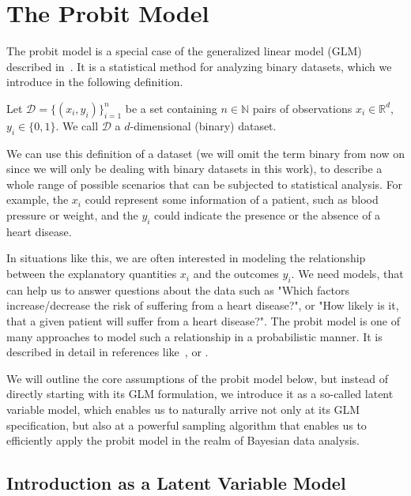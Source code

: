\section{The Probit Model}

The probit model is a special case of the generalized linear model (GLM)
described in~\cite{glm-nelder}.
It is a statistical method for analyzing binary datasets,
which we introduce in the following definition.

\begin{definition}[Dataset]
    Let $\mathcal{D} = \{(x_i, y_i)\}_{i=1}^n$ be a set containing
    $n \in \mathbb{N}$ pairs of observations $x_i \in \mathbb{R}^d$,
    $y_i \in \{0, 1\}$.
    We call $\mathcal{D}$ a $d$-dimensional (binary) dataset.
\end{definition}

\noindent We can use this definition of a dataset
(we will omit the term binary from now on since we will only be dealing
with binary datasets in this work), to describe a whole range of possible scenarios
that can be subjected to statistical analysis.
For example, the $x_i$ could represent some information of a patient, such as
blood pressure or weight, and the $y_i$ could indicate the presence or
the absence of a heart disease.

In situations like this, we are often interested in modeling the
relationship between the explanatory quantities $x_i$ and the
outcomes $y_i$.
We need models, that can help us to answer questions about the data
such as "Which factors increase/decrease the risk of suffering from a heart disease?",
or "How likely is it, that a given patient will suffer from a heart disease?".
The probit model is one of many approaches to model such a
relationship in a probabilistic manner.
It is described in detail in references like~\cite{glm-nelder},
\cite{glm-agresti} or \cite{regression-fahrmeir}.

We will outline the core assumptions of the probit model below,
but instead of directly starting with its GLM formulation, we introduce
it as a so-called latent variable model, which enables us to
naturally arrive not only at its GLM specification, but also
at a powerful sampling algorithm that enables us to efficiently apply
the probit model in the realm of Bayesian data analysis.

\subsection{Introduction as a Latent Variable Model}
\label{sec:probit-introduction}

